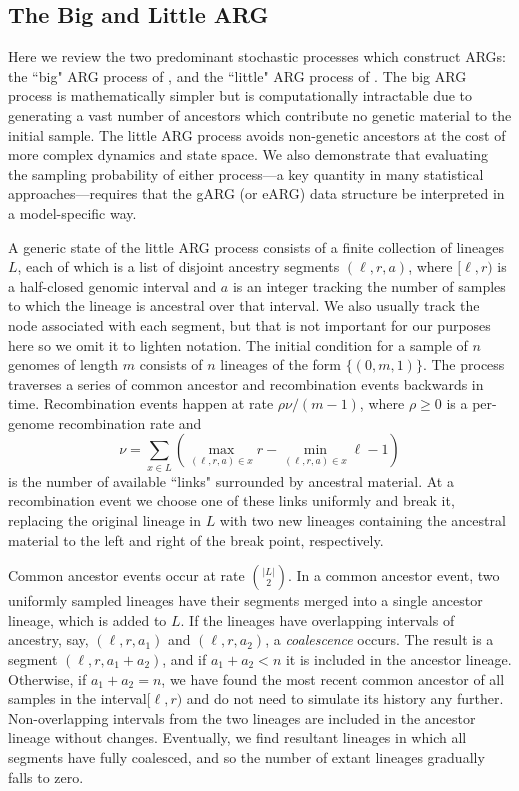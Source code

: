 \documentclass{article}
\begin{document}
\subsection*{The Big and Little ARG}
\label{app-big-and-little-arg}

Here we review the two predominant stochastic processes which construct ARGs:
the ``big" ARG process of \cite{griffiths1997ancestral}, and the ``little" ARG process of
 \cite{hudson1983properties}. The big ARG process is mathematically simpler
 but is computationally intractable due to generating a vast number of ancestors
 which contribute no genetic material to the initial sample.
The little ARG process avoids non-genetic ancestors at the cost of more complex
dynamics and state space. We also demonstrate that evaluating the sampling probability
of either process---a key quantity in many statistical approaches---requires that the
gARG (or eARG) data structure be interpreted in a model-specific way.

A generic state of the little ARG process consists of a finite collection of lineages $L$,
each of which is a list of disjoint ancestry segments $(\ell, r, a)$, where
$[\ell, r)$ is a half-closed genomic interval and $a$ is an integer
tracking the number of samples to which the lineage is ancestral over that interval.
We also usually track the node associated with each segment, but
that is not important for our purposes here so we omit it to lighten notation.
The initial condition for a sample of $n$ genomes of length $m$ consists of $n$ lineages
of the form $\{(0, m, 1)\}$. The process traverses a series of common ancestor and
recombination events backwards in time.
Recombination events happen at rate $\rho \nu / (m - 1)$,
where $\rho \geq 0$ is a per-genome recombination rate and
 \[
 \nu = \sum_{x \in L}\left( \max_{(\ell, r, a) \in x}r
     - \min_{(\ell, r, a) \in x}\ell - 1 \right)
 \]
 is the number of available ``links" surrounded by ancestral material.
 At a recombination event we choose one of these links uniformly and break it,
 replacing the original lineage in $L$ with two new lineages containing the ancestral material
 to the left and right of the break point, respectively.

Common ancestor events occur at rate $\binom{|L|}{2}$.
In a common ancestor event, two uniformly sampled lineages have their segments
merged into a single ancestor lineage, which is added to $L$.
If the lineages have overlapping intervals of ancestry,
say, $(\ell, r, a_1)$ and $(\ell, r, a_2)$, a
\emph{coalescence} occurs. The result is a segment
$(\ell, r, a_1 + a_2)$, and if $a_1 + a_2 < n$ it is included in the
ancestor lineage. Otherwise, if $a_1 + a_2 = n$, we have found
the most recent common ancestor of all samples in the interval$[\ell, r)$
and do not need to simulate its history any further.
Non-overlapping intervals from the two lineages are included
 in the ancestor lineage without changes. Eventually,
we find resultant lineages in which all segments have fully coalesced,
and so the number of extant lineages gradually falls to zero.
\end{document}
